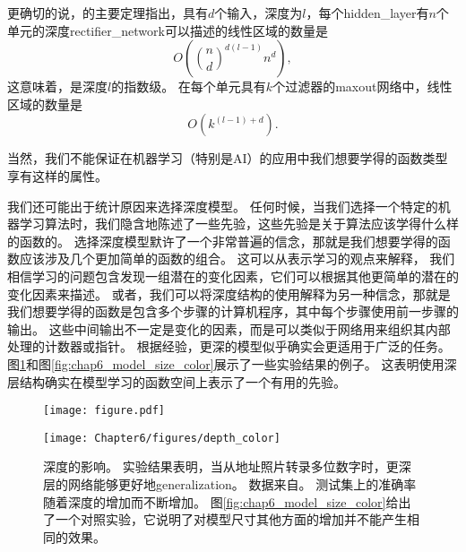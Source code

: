 更确切的说，\cite{Montufar-et-al-NIPS2014}的主要定理指出，具有$d$个输入，深度为$l$，每个\gls{hidden_layer}有$n$个单元的深度\gls{rectifier_network}可以描述的线性区域的数量是
\begin{equation}
O \left ( {n \choose d}^{d(l-1)} n^d \right ),
\end{equation}
这意味着，是深度$l$的指数级。
在每个单元具有$k$个过滤器的maxout网络中，线性区域的数量是
\begin{equation}
O \left ( k^{(l-1)+d} \right ).
\end{equation}


当然，我们不能保证在机器学习（特别是AI）的应用中我们想要学得的函数类型享有这样的属性。

我们还可能出于统计原因来选择深度模型。
任何时候，当我们选择一个特定的机器学习算法时，我们隐含地陈述了一些先验，这些先验是关于算法应该学得什么样的函数的。
选择深度模型默许了一个非常普遍的信念，那就是我们想要学得的函数应该涉及几个更加简单的函数的组合。
这可以从表示学习的观点来解释， 我们相信学习的问题包含发现一组潜在的变化因素，它们可以根据其他更简单的潜在的变化因素来描述。
或者，我们可以将深度结构的使用解释为另一种信念，那就是我们想要学得的函数是包含多个步骤的计算机程序，其中每个步骤使用前一步骤的输出。
这些中间输出不一定是变化的因素，而是可以类似于网络用来组织其内部处理的计数器或指针。
根据经验，更深的模型似乎确实会更适用于广泛的任务\citep{Bengio-NIPS2007,Erhan2009,Bengio-2009-book,UTLC+LISA-2011-small,Ciresan-et-al-2012,Krizhevsky-2012-small,sermanet-cvpr-13,Farabet-et-al-2013,couprie-iclr-13,LISA-EmotiW2013,Goodfellow+et+al-ICLR2014a,Szegedy-et-al-arxiv2014}。
图\ref{fig:chap6_depth_color}和图\ref{fig:chap6_model_size_color}展示了一些实验结果的例子。
这表明使用深层结构确实在模型学习的函数空间上表示了一个有用的先验。
\begin{figure}[!htb]
\ifOpenSource
\centerline{\texttt{[image: figure.pdf]}}
\else
\centerline{\texttt{[image: Chapter6/figures/depth\_color]}}
\fi
\caption{深度的影响。
实验结果表明，当从地址照片转录多位数字时，更深层的网络能够更好地\gls{generalization}。
数据来自\cite{Goodfellow+et+al-ICLR2014a}。
测试集上的准确率随着深度的增加而不断增加。
图\ref{fig:chap6_model_size_color}给出了一个对照实验，它说明了对模型尺寸其他方面的增加并不能产生相同的效果。}
\label{fig:chap6_depth_color}
\end{figure}

